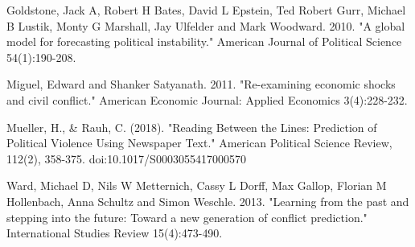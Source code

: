 \noindent Goldstone, Jack A, Robert H Bates, David L Epstein, Ted Robert Gurr, Michael B Lustik, \newline \indent Monty G Marshall, Jay Ulfelder and Mark Woodward. 2010. "A global model for \newline \indent forecasting political instability." American Journal of Political Science 54(1):190-208.\vspace{0.25cm}

\noindent Miguel, Edward and Shanker Satyanath. 2011. "Re-examining economic shocks and civil \newline \indent conflict." American Economic Journal: Applied Economics 3(4):228-232.\vspace{0.25cm}

\noindent Mueller, H., \& Rauh, C. (2018). "Reading Between the Lines: Prediction of Political \newline \indent Violence Using Newspaper Text." American Political Science Review, 112(2), 358-375. \newline \indent doi:10.1017/S0003055417000570\vspace{0.25cm}

\noindent Ward, Michael D, Nils W Metternich, Cassy L Dorff, Max Gallop, Florian M Hollenbach, \newline \indent Anna Schultz and Simon Weschle. 2013. "Learning from the past and stepping into \newline \indent the future: Toward a new generation of conflict prediction." International Studies \newline \indent Review 15(4):473-490.

\clearpage

